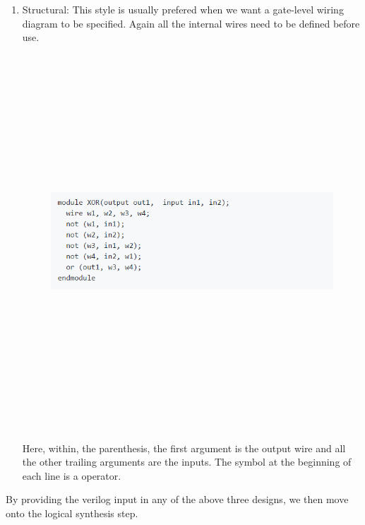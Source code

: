 \documentclass[11pt]{article}
\begin{document}
\begin{enumerate}
\item Structural: 
This style is usually prefered when we want  a gate-level wiring diagram to be specified. Again all the internal wires need to be defined before use.
\begin{figure}[ht!]
\centering
\includegraphics[width=11cm,height=14cm,keepaspectratio]{Screenshot_4.png}
\label{Structural exmaple}
\end{figure}

Here, within, the parenthesis, the first argument is the output wire and all the other trailing arguments are the inputs. The symbol at the beginning of each line is a operator.\\[\baselineskip]     
\bigskip
\bigskip
\bigskip
\bigskip
\end{enumerate}
By providing the verilog input in any of the above three designs, we then move onto the logical synthesis step.
\end{document}
